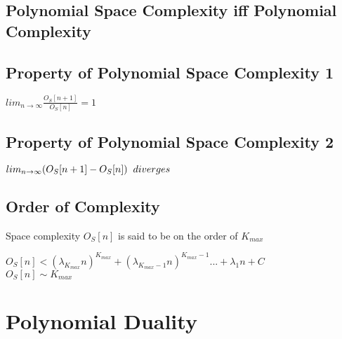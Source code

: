 \documentclass[11pt]{article}
\begin{document}
\subsection{Polynomial Space Complexity iff Polynomial Complexity}








\subsection{Property of Polynomial Space Complexity 1}
\begin{center}
$
lim_{n \rightarrow \infty} \frac{O_S[n+1]}{O_S[n]} = 1
$
\end{center}







\subsection{Property of Polynomial Space Complexity 2}
\begin{center}
$
lim_{n \rightarrow \infty}( O_S[n+1] - O_S[n] ) \hspace{2mm} diverges
$
\end{center}








\subsection{Order of Complexity}
Space complexity $O_S[n]$ is said to be on the order of $K_{max}$
\begin{center}
$
O_S[n] < (\lambda_{K_{max}} n)^{K_{max}} + (\lambda_{K_{max}-1} n)^{K_{max}-1}... + \lambda_1 n + C
$
\\ \vspace{2mm}
$
O_S[n] \sim K_{max}
$
\end{center}

















\newpage
\section{Polynomial Duality}
\end{document}
